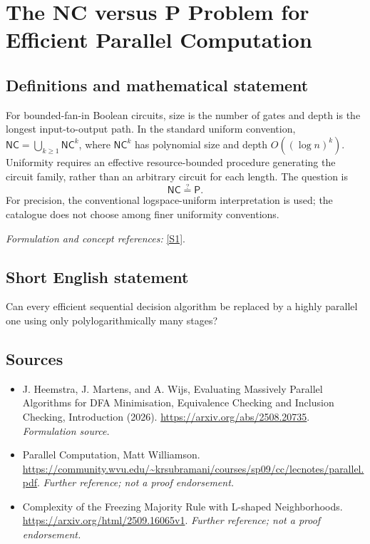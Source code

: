 \documentclass[11pt]{article}
\begin{document}
\section*{\texorpdfstring{The NC versus P Problem for Efficient Parallel Computation}{The NC versus P Problem for Efficient Parallel Computation}}\label{statement}
\subsection{Definitions and mathematical statement}
For bounded-fan-in Boolean circuits, size is the number of gates and depth is the longest input-to-output path. In the standard uniform convention, $\mathsf{NC}=\bigcup_{k\ge1}\mathsf{NC}^k$, where $\mathsf{NC}^k$ has polynomial size and depth $O((\log n)^k)$. Uniformity requires an effective resource-bounded procedure generating the circuit family, rather than an arbitrary circuit for each length. The question is
\[
 \mathsf{NC}\stackrel{?}{=}\mathsf P.
\]
For precision, the conventional logspace-uniform interpretation is used; the catalogue does not choose among finer uniformity conventions.
\par\smallskip\textit{Formulation and concept references:} \href{https://arxiv.org/abs/2508.20735}{[S1]}.

\subsection{Short English statement}
Can every efficient sequential decision algorithm be replaced by a highly parallel one using only polylogarithmically many stages?
\subsection{Sources}
\begin{itemize}
\item[S1]J. Heemstra, J. Martens, and A. Wijs, Evaluating Massively Parallel Algorithms for DFA Minimisation, Equivalence Checking and Inclusion Checking, Introduction (2026).
\url{https://arxiv.org/abs/2508.20735}.
\textit{Formulation source.}
\item[S2]Parallel Computation, Matt Williamson.
\url{https://community.wvu.edu/~krsubramani/courses/sp09/cc/lecnotes/parallel.pdf}.
\textit{Further reference; not a proof endorsement.}
\item[S3]Complexity of the Freezing Majority Rule with L-shaped Neighborhoods.
\url{https://arxiv.org/html/2509.16065v1}.
\textit{Further reference; not a proof endorsement.}
\end{itemize}
\end{document}
